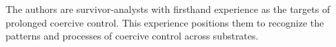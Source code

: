 The authors are survivor-analysts with firsthand experience as the targets of prolonged coercive control. This experience positions them to recognize the patterns and processes of coercive control across substrates.